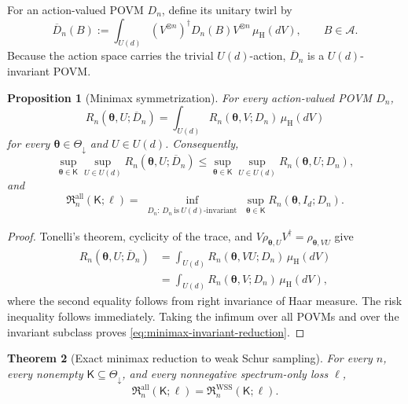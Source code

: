 \documentclass{article}
\newtheorem{theorem}{Theorem}[section]
\newtheorem{prop}[theorem]{Proposition}
\theoremstyle{named}
\theoremstyle{named1}
\newcommand{\WSS}{\mathrm{WSS}}
\newcommand{\btheta}{\boldsymbol{\theta}}
\newcommand{\Haar}{\mu_{\mathrm H}}
\theoremstyle{plain}
\theoremstyle{remark}
\begin{document}
For an action-valued POVM \(D_n\), define its unitary twirl by
\[
    \overline D_n(B)
    :=\int_{U(d)}(V^{\otimes n})^{\dagger}D_n(B)V^{\otimes n}\,\Haar(dV),
    \qquad B\in\mathcal A.
\]
Because the action space carries the trivial \(U(d)\)-action,
\(\overline D_n\) is a \(U(d)\)-invariant POVM.

\begin{prop}[Minimax symmetrization]
\label{prop:minimax-symmetrization}
For every action-valued POVM \(D_n\),
\[
    R_n(\btheta,U;\overline D_n)
    =\int_{U(d)}R_n(\btheta,V;D_n)\,\Haar(dV)
\]
for every \(\btheta\in\Theta_{\downarrow}\) and \(U\in U(d)\).
Consequently,
\[
    \sup_{\btheta\in\mathsf K}\sup_{U\in U(d)}
      R_n(\btheta,U;\overline D_n)
    \leq
    \sup_{\btheta\in\mathsf K}\sup_{U\in U(d)}
      R_n(\btheta,U;D_n),
\]
and
\begin{equation}
    \mathfrak R_n^{\mathrm{all}}(\mathsf K;\ell)
    =\inf_{\substack{D_n:\,D_n\ \mathrm{is}\ U(d)\text{-}\mathrm{invariant}}}
      \sup_{\btheta\in\mathsf K}R_n(\btheta,I_d;D_n).
\label{eq:minimax-invariant-reduction}
\end{equation}
\end{prop}

\begin{proof}
Tonelli's theorem, cyclicity of the trace, and
\(V\rho_{\btheta,U}V^{\dagger}=\rho_{\btheta,VU}\) give
\[
\begin{aligned}
    R_n(\btheta,U;\overline D_n)
    &=\int_{U(d)}R_n(\btheta,VU;D_n)\,\Haar(dV)\\
    &=\int_{U(d)}R_n(\btheta,V;D_n)\,\Haar(dV),
\end{aligned}
\]
where the second equality follows from right invariance of Haar
measure. The risk inequality follows immediately. Taking the infimum
over all POVMs and over the invariant subclass proves
\eqref{eq:minimax-invariant-reduction}.
\end{proof}

\begin{theorem}[Exact minimax reduction to weak Schur sampling]
\label{thm:wss-exact-minimax}
For every \(n\), every nonempty
\(\mathsf K\subseteq\Theta_{\downarrow}\), and every nonnegative
spectrum-only loss \(\ell\),
\[
    \mathfrak R_n^{\mathrm{all}}(\mathsf K;\ell)
    =\mathfrak R_n^{\WSS}(\mathsf K;\ell).
\]
\end{theorem}
\end{document}
